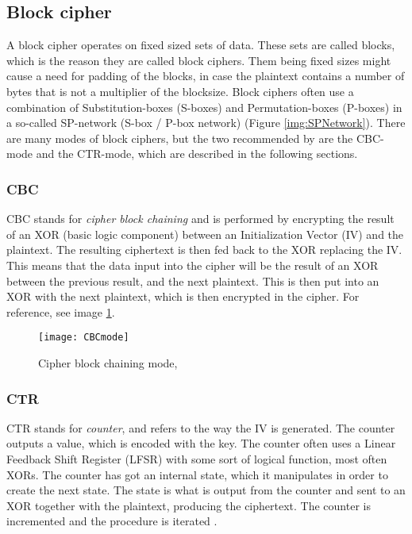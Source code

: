 \subsection{Block cipher}\label{sec:BlockCipher}
A block cipher operates on fixed sized sets of data. These sets are 
called blocks, which is the reason they are called block ciphers. 
Them being fixed sizes might cause a need for padding of the blocks, in 
case the plaintext contains a number of bytes that is not a multiplier
of the blocksize. Block ciphers often use a combination of Substitution-boxes 
(S-boxes) and Permutation-boxes (P-boxes) in a so-called SP-network 
(S-box / P-box network) (Figure \ref{img:SPNetwork}). There are many modes 
of block ciphers, but the two recommended by \citet{Schneier:2003} are the 
CBC-mode and the CTR-mode, which are described in the following sections.

\subsubsection{CBC} \label{sec:cbc}
CBC stands for \emph{cipher block chaining} and is performed by 
encrypting the result of an XOR (basic logic component) between 
an Initialization Vector (IV) and the plaintext. The resulting 
ciphertext is then fed back to the XOR replacing the IV.
This means that the data input into the cipher will be the result of 
an XOR between the previous result, and the next plaintext. This is 
then put into an XOR with the next plaintext, which is then encrypted 
in the cipher. For reference, see image \ref{img:CBCmode}. 
\citep[pp. 109--111]{Stinson:2006}

\begin{figure}
  \begin{center}
   \texttt{[image: CBCmode]}
  \end{center}
  \caption{Cipher block chaining mode, \citep{CBCmode:2014}}
  \label{img:CBCmode}
\end{figure}

\subsubsection{CTR}
CTR stands for \emph{counter}, and refers to the way the IV is 
generated. The counter outputs a value, which is encoded with the key. 
The counter often uses a Linear Feedback Shift Register (LFSR) with some 
sort of logical function, most often XORs. The counter has got an internal
state, which it manipulates in order to create the next state. The state
is what is output from the counter and sent to an XOR together with the 
plaintext, producing the ciphertext. The counter is incremented and the 
procedure is iterated \citep[p. 111]{Stinson:2006}.

